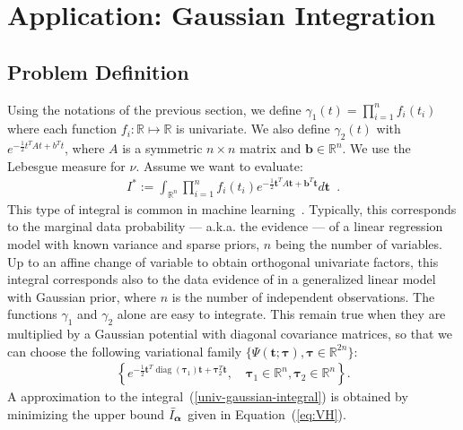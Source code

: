\documentclass{article} %
\renewcommand{\t}{\mathbf{t}}
\newcommand{\I}{I}
\newcommand{\diag}[1]{\mathop{\textrm{diag}}\left(#1\right)}
\newcommand{\transp}{^{T}}
\def\A{A}
\def\btau{{\bm{\tau}}}
\renewcommand{\Re}{\mathbb{R}}
\begin{document}


\section{Application: Gaussian Integration}

\subsection{Problem Definition}

Using the notations of the previous section, we define $\gamma_1(t)=\prod_{i=1}^n f_i(t_i)$ where each function $f_i:\Re\mapsto \Re$ is univariate. We also define $\gamma_2(t)$ with $e^{-\frac 12 t\transp \A t + b\transp t}$, where $A$ is a symmetric $n\times n$ matrix and $\bm b\in\Re^n$.
We use the Lebesgue measure for $\nu$. Assume we want to evaluate: 
\begin{eqnarray} 
I^*:=\int_{\Re^n}  \prod_{i=1}^n f_i(t_i)
e^{-\frac 12 \t\transp \A \t + \bm b\transp \t} d\t
\enspace.
\label{univ-gaussian-integral} 
\end{eqnarray}
This type of integral is common in machine learning~\citep{seeger2010gaussian}. Typically, this corresponds to the marginal data probability --- a.k.a. the evidence --- of a linear regression model with known variance and sparse priors, $n$ being the number of variables. 
Up to an affine change of variable to obtain orthogonal univariate factors, this integral corresponds also to the data evidence 
of in a generalized linear model with Gaussian prior, where $n$ is the number of independent observations. 
The functions $\gamma_1$ and $\gamma_2$ alone are easy to integrate. This remain true when they are multiplied by a
Gaussian potential with diagonal covariance matrices, so that we can choose the following variational family
$\{\Psi(\t;\btau) ,\btau\in\Re^{2n}\}$:
\begin{eqnarray}
	\left\lbrace
		e^{-\frac 12 \t\transp\diag{\btau_1}\t +  \btau_2\transp\t},
		\quad \btau_1\in\Re^n,\btau_2 \in \Re^n 
	\right\rbrace
.
\label{Gaussian-pivot-functions}
\end{eqnarray}
A approximation to the integral~(\ref{univ-gaussian-integral})  is obtained by minimizing the upper bound $\bar\I_\balpha$ given in Equation~(\ref{eq:VH}).


\end{document}
